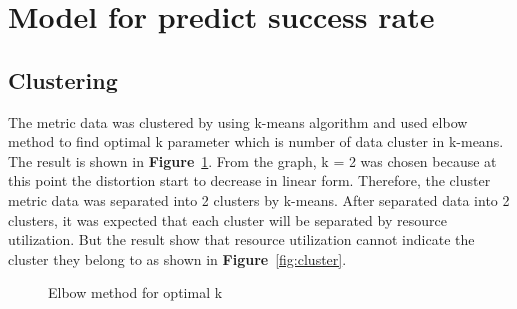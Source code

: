 \documentclass[12pt,oneside,openright,a4paper]{cpe-english-project}
\begin{document}
\newpage

\section{Model for predict success rate}

\subsection{Clustering}  

\hspace{10mm}The metric data was clustered by using k-means algorithm and used elbow method to find optimal k parameter which is number of data cluster in k-means. The result is shown in  \textbf{Figure}~\ref{fig:elbow}. From the graph, k = 2 was chosen because at this point the distortion start to decrease in linear form. Therefore, the cluster metric data was separated into 2 clusters by k-means. After separated data into 2 clusters, it was expected that each cluster will be separated by resource utilization. But the result show that resource utilization cannot indicate the cluster they belong to as shown in \textbf{Figure}~\ref{fig:cluster}. 

\begin{figure}[!h]\centering
    \setlength{\fboxrule}{0mm} %
    \setlength{\fboxsep}{0cm}
    \caption{Elbow method for optimal k}\label{fig:elbow}
\end{figure}
\end{document}
